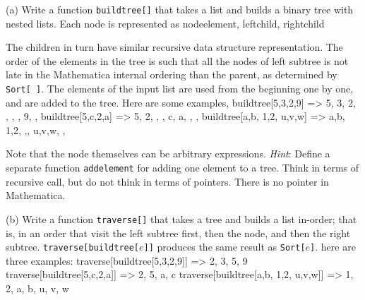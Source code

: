  (a) Write a function {\tt buildtree[]} that
takes a list and builds a binary tree with nested lists.  
Each node is represented as  
\ttbg
{ nodeelement, {leftchild}, {rightchild} }
\tted
\item{}The children in turn have similar recursive data structure 
representation.
The order of the elements in the tree is such that all the nodes of 
left subtree is not late in the
Mathematica internal ordering than the parent, as determined 
by {\tt Sort[ ]}. 
The elements of the input list are used from the beginning one
by one, and are added to the tree.  Here are some examples,
\ttbg
buildtree[{5,3,2,9}]  => {5, {3, {2, {}, {}}, {}}, {9, {}, {}}}
buildtree[{5,c,2,a}]  => {5, {2, {}, {}}, {c, {a, {}, {}}, {}}}
buildtree[{{a,b}, {1,2}, {u,v,w}}] => {{a,b}, {{1,2}, {},{}}, {{u,v,w}, {},{}}}
\tted
\item{} Note that the node themselves can be arbitrary expressions. 
{\sl Hint}: Define a separate function {\tt addelement} for adding
one element to a tree.
Think in terms of recursive call, but do not think in
terms of pointers.  There is no pointer in Mathematica. 
\item{} (b) Write a function {\tt traverse[]} that takes a tree
and builds a list in-order; that is, in an order
that visit the left subtree first, then the node, and then the right
subtree.  {\tt traverse[buildtree[$e$]]} produces the same
result as {\tt Sort[$e$]}.  here are three examples:
\ttbg
traverse[buildtree[{5,3,2,9}]]  => {2, 3, 5, 9}
traverse[buildtree[{5,c,2,a}]]  => {2, 5, a, c}
traverse[buildtree[{{a,b}, {1,2}, {u,v,w}}]] => {{1, 2}, {a, b}, {u, v, w}}
\tted


\bye
